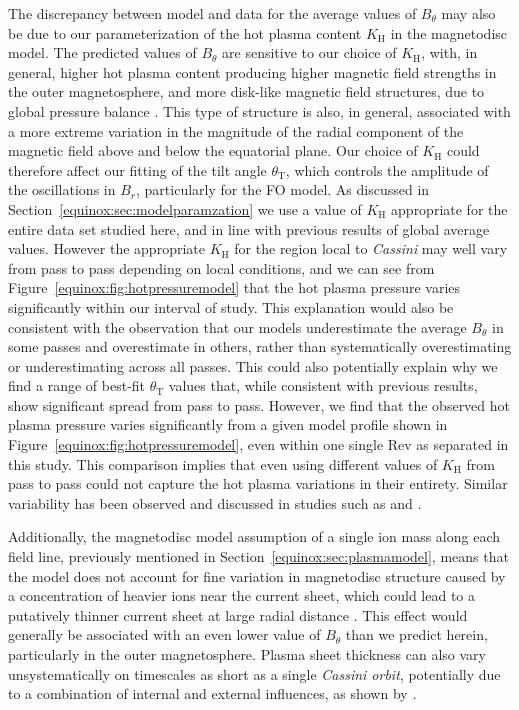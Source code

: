 The discrepancy between model and data for the average values of $B_{\theta}$ may also be due to our parameterization of the hot plasma content $K_\mathrm{H}$ in the magnetodisc model. The predicted values of $B_{\theta}$ are sensitive to our choice of $K_\mathrm{H}$, with, in general, higher hot plasma content producing higher magnetic field strengths in the outer magnetosphere, and more disk-like magnetic field structures, due to global pressure balance \citep[see][]{achilleos2010b,sorba2017}. This type of structure is also, in general, associated with a more extreme variation in the magnitude of the radial component of the magnetic field above and below the equatorial plane. Our choice of $K_\mathrm{H}$ could therefore affect our fitting of the tilt angle $\theta_\mathrm{T}$, which controls the amplitude of the oscillations in $B_r$, particularly for the FO model. As discussed in Section~\ref{equinox:sec:modelparamzation} we use a value of $K_\mathrm{H}$ appropriate for the entire data set studied here, and in line with previous results of global average values. However the appropriate $K_\mathrm{H}$ for the region local to \textit{Cassini} may well vary from pass to pass depending on local conditions, and we can see from Figure~\ref{equinox:fig:hotpressuremodel} that the hot plasma pressure varies significantly within our interval of study. This explanation would also be consistent with the observation that our models underestimate the average $B_{\theta}$ in some passes and overestimate in others, rather than systematically overestimating or underestimating across all passes. This could also potentially explain why we find a range of best-fit $\theta_\mathrm{T}$ values that, while consistent with previous results, show significant spread from pass to pass. However, we find that the observed hot plasma pressure varies significantly from a given model profile shown in Figure~\ref{equinox:fig:hotpressuremodel}, even within one single Rev as separated in this study. This comparison implies that even using different values of $K_\mathrm{H}$ from pass to pass could not capture the hot plasma variations in their entirety. Similar variability has been observed and discussed in studies such as \citet{sergis2007} and \citet{kellett2010}.

Additionally, the magnetodisc model assumption of a single ion mass along each field line, previously mentioned in Section~\ref{equinox:sec:plasmamodel}, means that the model does not account for fine variation in magnetodisc structure caused by a concentration of heavier ions near the current sheet, which could lead to a putatively thinner current sheet at large radial distance \citep{nemeth2011}. This effect would generally be associated with an even lower value of $B_{\theta}$ than we predict herein, particularly in the outer magnetosphere. Plasma sheet thickness can also vary unsystematically on timescales as short as a single \textit{Cassini orbit}, potentially due to a combination of internal and external influences, as shown by \citet{sergis2011}.

